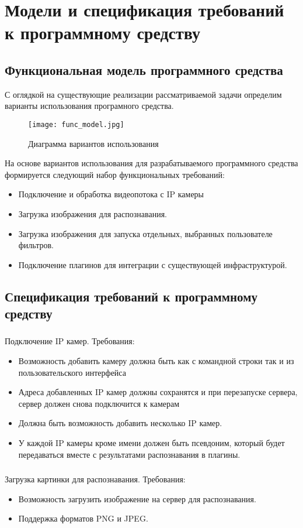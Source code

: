\section{Модели и спецификация требований к программному средству}
\label{sec:funcreq}

\subsection{Функциональная модель программного средства}
\label{sec:funcreq:funcmodel}

С оглядкой на существующие реализации рассматриваемой задачи определим варианты использования програмного средства.

\begin{figure}[ht]
\centering
    \texttt{[image: func\_model.jpg]}  
    \caption{Диаграмма вариантов использования}
  \label{fig:funcreq:funcmodel}
\end{figure}

На основе вариантов использования для разрабатываемого программного средства формируется следующий набор функциональных требований:
\begin{itemize}
	\item Подключение и обработка видеопотока с IP камеры
	\item Загрузка изображения для распознавания.
	\item Загрузка изображения для запуска отдельных, выбранных пользователе фильтров.
	\item Подключение плагинов для интеграции с существующей инфраструктурой.
\end{itemize}

\subsection{Спецификация требований к программному средству}
\label{sec:fucreq:specification}

\subsubsection{}
Подключение IP камер. Требования:
\begin{itemize}
	\item Возможность добавить камеру должна быть как с командной строки так и из пользовательского интерфейса
	\item Адреса добавленных IP камер должны сохранятся и при перезапуске сервера, сервер должен снова подключится к камерам
	\item Должна быть возможность добавить несколько IP камер.
	\item У каждой IP камеры кроме имени должен быть псевдоним, который будет передаваться вместе с результатами распознавания в плагины. 
\end{itemize}

\subsubsection{}
Загрузка картинки для распознавания. Требования:
\begin{itemize}
	\item Возможность загрузить изображение на сервер для распознавания.
	\item Поддержка форматов PNG и JPEG.
\end{itemize}


